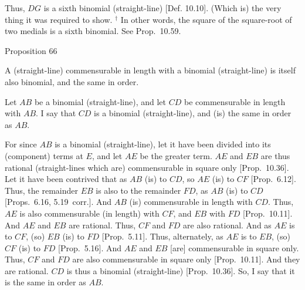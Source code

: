 Thus, $DG$ is a sixth binomial (straight-line) [Def. 10.10]. (Which is) the very thing it
was required to show.
{\footnotesize\noindent $^\dag$ In other words, the square of the square-root of  two  medials  is a
sixth binomial. See Prop.~10.59.}


\begin{center}
{\large Proposition 66}
\end{center}

A (straight-line) commensurable in length with
a binomial (straight-line) is itself also binomial, and the same in order.

Let $AB$ be a binomial (straight-line), and let $CD$ be commensurable
in length with $AB$. I say that $CD$ is a binomial (straight-line),
and (is)  the same in order as $AB$.

\epsfysize=0.7in 
\centerline{}

For since $AB$ is a binomial (straight-line), let it have been divided into
its (component) terms at $E$, and let $AE$ be the greater term. $AE$ and
$EB$ are thus rational (straight-lines which are) commensurable in square only [Prop.~10.36]. Let it have been contrived
that as $AB$ (is) to $CD$, so $AE$ (is) to $CF$ [Prop.~6.12]. Thus, the remainder $EB$ is also
to the remainder $FD$, as $AB$ (is) to $CD$ [Props.~6.16, 5.19~corr.]. 
And $AB$ (is) commensurable in length with $CD$. Thus, $AE$ is also
commensurable (in length) with $CF$, and $EB$ with $FD$ [Prop.~10.11]. And $AE$ and $EB$ are rational.
Thus, $CF$ and $FD$ are also rational. And  as $AE$
is to $CF$, (so) $EB$ (is) to $FD$ [Prop.~5.11]. 
Thus, alternately, as $AE$ is to $EB$, (so) $CF$ (is) to $FD$ [Prop.~5.16]. And $AE$ and $EB$ [are]
commensurable in square only. Thus, $CF$ and $FD$ are also
commensurable in square only [Prop.~10.11]. 
And they are rational. $CD$ is thus a binomial (straight-line) [Prop.~10.36]. So, I say that it is the same in order as $AB$.

